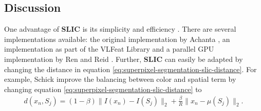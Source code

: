 \subsection{Discussion}

One advantage of \textbf{SLIC} is its simplicity and efficiency \cite{AchantaShajiSmithLucchiFuaSuesstrunk:2012}. There are several implementations available: the original implementation by Achanta \etal \cite{AchantaShajiSmithLucchiFuaSuesstrunk:2010}, an implementation as part of the VLFeat Library \cite{VedaldiFulkerson:2008} and a parallel GPU implementation by Ren and Reid \cite{RenReid:2011}. Further, \textbf{SLIC} can easily be adapted by changing the distance in equation \eqref{eq:superpixel-segmentation-slic-distance}. For example, Schick \etal improve the balancing between color and spatial term by changing equation \eqref{eq:superpixel-segmentation-slic-distance} to
\begin{align}
	d(x_n, S_j) = (1 - \beta)\|I(x_n) - I(S_j)\|_2 + \frac{\beta}{R} \|x_n - \mu(S_j)\|_2.
\end{align}

